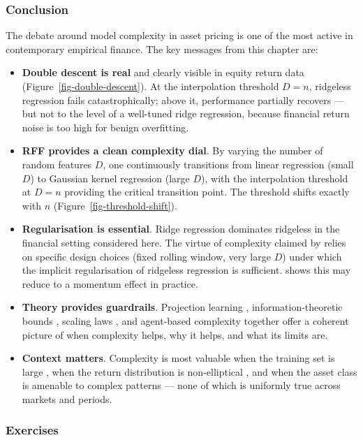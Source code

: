 \subsubsection{Conclusion}

The debate around model complexity in asset pricing is one of the most active in contemporary empirical finance. The key messages from this chapter are:

\begin{itemize}
\item \textbf{Double descent is real} and clearly visible in equity return data (Figure~\ref{fig-double-descent}). At the interpolation threshold $D = n$, ridgeless regression fails catastrophically; above it, performance partially recovers --- but not to the level of a well-tuned ridge regression, because financial return noise is too high for benign overfitting.
\item \textbf{RFF provides a clean complexity dial}. By varying the number of random features $D$, one continuously transitions from linear regression (small $D$) to Gaussian kernel regression (large $D$), with the interpolation threshold at $D = n$ providing the critical transition point. The threshold shifts exactly with $n$ (Figure~\ref{fig-threshold-shift}).
\item \textbf{Regularisation is essential}. Ridge regression dominates ridgeless in the financial setting considered here. The virtue of complexity claimed by \cite{kelly2024virtue} relies on specific design choices (fixed rolling window, very large $D$) under which the implicit regularisation of ridgeless regression is sufficient. \cite{nagel2025seemingly} shows this may reduce to a momentum effect in practice.
\item \textbf{Theory provides guardrails}. Projection learning \citep{fallahgoul2025learning}, information-theoretic bounds \citep{fallahgoul2025high}, scaling laws \citep{timmermann2026compute}, and agent-based complexity \citep{molavi2024model} together offer a coherent picture of when complexity helps, why it helps, and what its limits are.
\item \textbf{Context matters}. Complexity is most valuable when the training set is large \citep{chen2025model}, when the return distribution is non-elliptical \citep{huang2025beyond}, and when the asset class is amenable to complex patterns --- none of which is uniformly true across markets and periods.
\end{itemize}

\subsubsection{Exercises}

